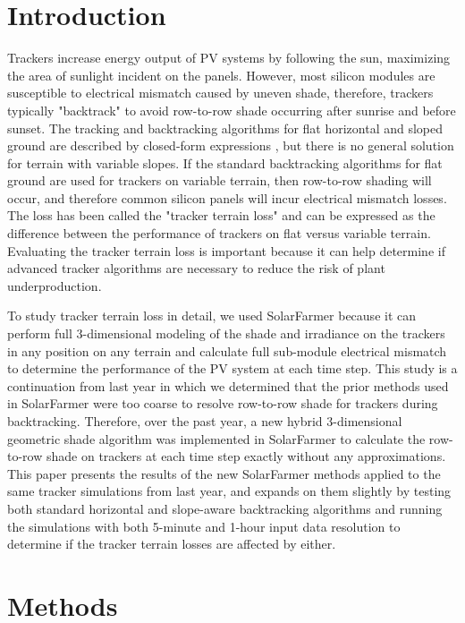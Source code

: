 \documentclass[conference]{IEEEtran}
\begin{document}
\section{Introduction}
Trackers increase energy output of PV systems by following the sun, maximizing the area of sunlight incident on the panels. However, most silicon modules are susceptible to electrical mismatch caused by uneven shade, therefore, trackers typically "backtrack" to avoid  row-to-row shade occurring after sunrise and before sunset. The tracking and backtracking algorithms for flat horizontal and sloped ground are described by closed-form expressions \cite{Marion2013,Anderson2020}, but there is no general solution for terrain with variable slopes. If the standard backtracking algorithms for flat ground are used for trackers on variable terrain, then row-to-row shading will occur, and therefore common silicon panels will incur electrical mismatch losses. The loss has been called the "tracker terrain loss" and can be expressed as the difference between the performance of trackers on flat versus variable terrain. Evaluating the tracker terrain loss is important because it can help determine if advanced tracker algorithms are necessary to reduce the risk of plant underproduction.

To study tracker terrain loss in detail, we used SolarFarmer \cite{Mikofski_8547323} because it can perform full 3-dimensional modeling of the shade and irradiance on the trackers in any position on any terrain and calculate full sub-module electrical mismatch to determine the performance of the PV system at each time step. This study is a continuation from last year \cite{Mikofski_9300381} in which we determined that the prior methods used in SolarFarmer were too coarse to resolve row-to-row shade for trackers during backtracking. Therefore, over the past year, a new hybrid 3-dimensional geometric shade algorithm was implemented in SolarFarmer to calculate the row-to-row shade on trackers at each time step exactly without any approximations. This paper presents the results of the new SolarFarmer methods applied to the same tracker simulations from last year, and expands on them slightly by testing both standard horizontal and slope-aware backtracking algorithms and running the simulations with both 5-minute and 1-hour input data resolution to determine if the tracker terrain losses are affected by either.

\section{Methods}
\end{document}
